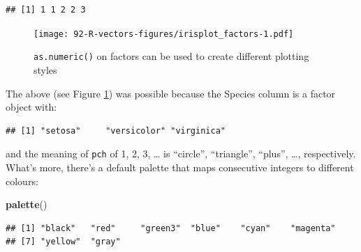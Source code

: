 \documentclass[10pt,b5paper,krantz1]{krantz}
\newenvironment{Shaded}{\begin{snugshade}}{\end{snugshade}}
\newcommand{\CommentTok}[1]{\textcolor[rgb]{0.37,0.37,0.37}{\textit{#1}}}
\newcommand{\DataTypeTok}[1]{\textcolor[rgb]{0.27,0.27,0.27}{#1}}
\newcommand{\KeywordTok}[1]{\textcolor[rgb]{0.27,0.27,0.27}{\textbf{#1}}}
\newcommand{\NormalTok}[1]{#1}
\newcommand{\OperatorTok}[1]{\textcolor[rgb]{0.43,0.43,0.43}{\textbf{#1}}}
\begin{document}
\begin{verbatim}
## [1] 1 1 2 2 3
\end{verbatim}

\begin{Shaded}
\end{Shaded}

\begin{figure}
\hypertarget{fig:irisplot_factors}{%
\centering
\texttt{[image: 92-R-vectors-figures/irisplot\_factors-1.pdf]}
\caption{\texttt{as.numeric()} on factors can be used to create different plotting styles}\label{fig:irisplot_factors}
}
\end{figure}

The above (see Figure \ref{fig:irisplot_factors})
was possible because the Species column is a factor object
with:

\begin{Shaded}
\end{Shaded}

\begin{verbatim}
## [1] "setosa"     "versicolor" "virginica"
\end{verbatim}

and the meaning of \texttt{pch} of 1, 2, 3, \ldots{} is ``circle'', ``triangle'', ``plus'', \ldots{},
respectively. What's more, there's a default palette that maps
consecutive integers to different colours:

\begin{Shaded}
\begin{Highlighting}[]
\KeywordTok{palette}\NormalTok{()}
\end{Highlighting}
\end{Shaded}

\begin{verbatim}
## [1] "black"   "red"     "green3"  "blue"    "cyan"    "magenta"
## [7] "yellow"  "gray"
\end{verbatim}
\end{document}
